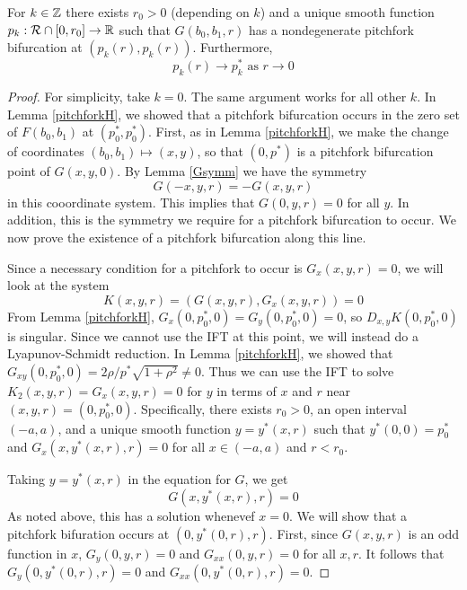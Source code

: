\documentclass[thesis.tex]{subfiles}
\begin{document}
\begin{lemma}\label{pitchpersist}
For $k \in {\mathbb Z}$ there exists $r_0 > 0$ (depending on $k$) and a unique smooth function $p_k: \mathcal{R} \cap [0, r_0] \rightarrow {\mathbb R}$ such that $G(b_0, b_1, r)$ has a nondegenerate pitchfork bifurcation at $(p_k(r),p_k(r))$. Furthermore, 
\begin{equation*}
p_k(r) \rightarrow p_k^* \text{ as } r \rightarrow 0
\end{equation*}
\begin{proof}
For simplicity, take $k = 0$. The same argument works for all other $k$. In Lemma \ref{pitchforkH}, we showed that a pitchfork bifurcation occurs in the zero set of $F(b_0, b_1)$ at $(p_0^*, p_0^*)$. First, as in Lemma \ref{pitchforkH}, we make the change of coordinates $(b_0, b_1) \mapsto (x, y)$, so that $(0, p^*)$ is a pitchfork bifurcation point of $G(x, y, 0)$. By Lemma \ref{Gsymm} we have the symmetry 
\[
G(-x, y, r) = -G(x, y, r)
\]
in this cooordinate system. This implies that $G(0, y, r) = 0$ for all $y$. In addition, this is the symmetry we require for a pitchfork bifurcation to occur. We now prove the existence of a pitchfork bifurcation along this line. 

Since a necessary condition for a pitchfork to occur is $G_x(x, y, r) = 0$, we will look at the system
\begin{equation}
K(x,y,r) = (G(x,y,r), G_x(x,y,r)) = 0
\end{equation}
From Lemma \ref{pitchforkH}, $G_x(0,p_0^*,0) = G_y(0, p_0^*, 0) = 0$, so $D_{x,y}K(0,p_0^*,0)$ is singular. Since we cannot use the IFT at this point, we will instead do a Lyapunov-Schmidt reduction. In Lemma \ref{pitchforkH}, we showed that $G_{xy}(0, p_0^*, 0) = 2 \rho/p^* \sqrt{1 + \rho^2} \neq 0$. Thus we can use the IFT to solve $K_2(x,y,r) = G_x(x,y,r) = 0$ for $y$ in terms of $x$ and $r$ near $(x,y,r) = (0, p_0^*, 0)$. Specifically, there exists $r_0 > 0$, an open interval $(-a, a)$, and a unique smooth function $y = y^*(x, r)$ such that $y^*(0, 0) = p_0^*$ and $G_x(x, y^*(x, r), r) = 0$ for all $x \in (-a, a)$ and $r < r_0$.

Taking $y = y^*(x, r)$ in the equation for $G$, we get
\begin{equation}
G(x, y^*(x, r), r) = 0
\end{equation}
As noted above, this has a solution whenevef $x = 0$. We will show that a pitchfork bifuration occurs at $(0, y^*(0, r), r)$. First, since $G(x, y, r)$ is an odd function in $x$, $G_y(0, y, r) = 0$ and $G_{xx}(0, y, r) = 0$ for all $x, r$. It follows that $G_y(0, y^*(0, r), r) = 0$ and $G_{xx}(0, y^*(0, r), r) = 0$.


\end{proof}
\end{lemma}
\end{document}
